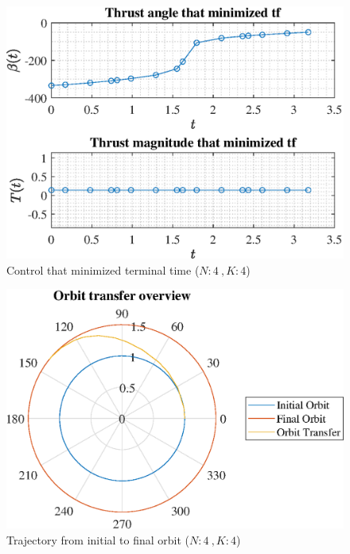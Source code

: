\documentclass[]{article}
\begin{document}
	\begin{figure}
		\centering
		\includegraphics[scale=0.75]{control_N4_K4_C2_tf.eps}
		\caption{Control that minimized terminal time (\(N:4\ , K:4\))}
		\label{fig:control_N4_K4_C2_tf}
	\end{figure}
	\begin{figure}
		\centering
		\includegraphics[scale=0.75]{orbit_N4_K4_C2_tf.eps}
		\caption{Trajectory from initial to final orbit (\(N:4\ , K:4\))}
		\label{fig:orbit_N4_K4_C2_tf}
	\end{figure}
\end{document}
